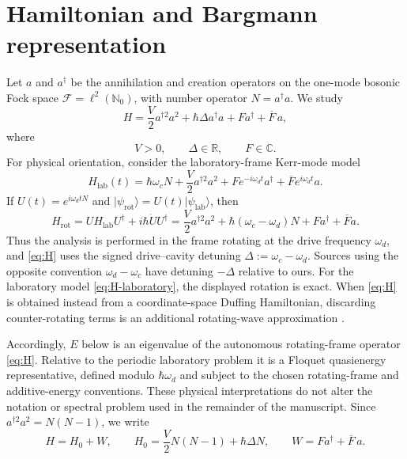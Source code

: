 \documentclass[11pt]{article}
\theoremstyle{remark}
\newcommand{\Fock}{\mathcal{F}}
\newcommand{\Nzero}{\mathbb{N}_{0}}
\begin{document}
\section{Hamiltonian and Bargmann representation}
\label{sec:hamiltonian-bargmann}

Let \(a\) and \(a^\dagger\) be the annihilation and creation operators on the
one-mode bosonic Fock space \(\Fock=\ell^2(\Nzero)\), with number operator
\(N=a^\dagger a\).  We study
\begin{equation}
  H=\frac{V}{2}a^{\dagger 2}a^2+\hbar\Delta a^\dagger a
    +F a^\dagger+\overline{F}\,a,
  \label{eq:H}
\end{equation}
where
\begin{equation}
  V>0,\qquad \Delta\in\mathbb{R},\qquad F\in\mathbb{C}.
  \label{eq:parameters}
\end{equation}
For physical orientation, consider the laboratory-frame Kerr-mode model
\begin{equation}
 H_{\mathrm{lab}}(t)=\hbar\omega_cN
 +\frac{V}{2}a^{\dagger2}a^2
 +F e^{-i\omega_dt}a^\dagger
 +\overline F e^{i\omega_dt}a.
 \label{eq:H-laboratory}
\end{equation}
If \(U(t)=e^{i\omega_dtN}\) and
\(\lvert\psi_{\mathrm{rot}}\rangle
=U(t)\lvert\psi_{\mathrm{lab}}\rangle\), then
\begin{equation}
 H_{\mathrm{rot}}
 =UH_{\mathrm{lab}}U^\dagger+i\hbar\dot U U^\dagger
 =\frac{V}{2}a^{\dagger2}a^2
  +\hbar(\omega_c-\omega_d)N
  +Fa^\dagger+\overline F a.
 \label{eq:rotating-frame-map}
\end{equation}
Thus the analysis is performed in the frame rotating at the drive frequency
\(\omega_d\), and \eqref{eq:H} uses the signed drive--cavity detuning
\(\Delta:=\omega_c-\omega_d\).  Sources using the opposite convention
\(\omega_d-\omega_c\) have detuning \(-\Delta\) relative to ours.  For the laboratory model
\eqref{eq:H-laboratory}, the displayed rotation is exact.  When
\eqref{eq:H} is obtained instead from a coordinate-space Duffing Hamiltonian,
discarding counter-rotating terms is an additional rotating-wave
approximation \cite{PeanoThorwart2006Duffing}.

Accordingly, \(E\) below is an eigenvalue of the autonomous rotating-frame
operator \eqref{eq:H}.  Relative to the periodic laboratory problem it is a
Floquet quasienergy representative, defined modulo \(\hbar\omega_d\) and
subject to the chosen rotating-frame and additive-energy conventions.  These
physical interpretations do not alter the notation or spectral problem used
in the remainder of the manuscript.
Since \(a^{\dagger 2}a^2=N(N-1)\), we write
\begin{equation}
  H=H_0+W,\qquad
  H_0=\frac{V}{2}N(N-1)+\hbar\Delta N,\qquad
  W=Fa^\dagger+\overline F\,a.
  \label{eq:split}
\end{equation}
\end{document}
